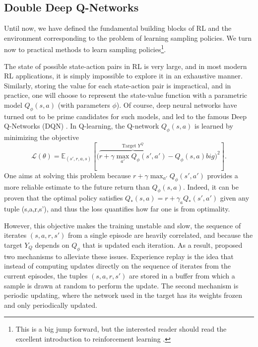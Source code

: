 \subsection{Double Deep Q-Networks}
Until now, we have defined the fundamental building blocks of RL and the environment corresponding to the problem of learning sampling policies. We turn now to practical methods to learn sampling policies\footnote{This is a big jump forward, but the interested reader should read the excellent introduction to reinforcement learning \citep{weng2018a}.}.

The state of possible state-action pairs in RL is very large, and in most modern RL applications, it is simply impossible to explore it in an exhaustive manner. Similarly, storing the value for each state-action pair is impractical, and in practice, one will choose to represent the state-value function with a parametric model $Q_\phi(s,a)$ (with parameters $\phi$). Of course, deep neural networks have turned out to be prime candidates for such models, and led to the famous Deep Q-Networks (DQN) \citep{mnih2015human}. In Q-learning, the Q-network $Q_\phi(s,a)$ is learned by minimizing the objective
$$\mathcal{L}(\theta) = \mathbb{E}_{(s',r,a,s)}\left[\big(\overbrace{r + \gamma \max_{a'} Q_\phi(s',a')}^{\text{Target } Y^Q} - Q_\phi(s,a)big)^2\right].$$
One aims at solving this problem because $r + \gamma \max_{a'} Q_\phi(s',a')$ provides a more reliable estimate to the future return than $Q_\phi(s,a)$. Indeed, it can be proven that the optimal policy satisfies $Q_*(s,a) = r + \gamma_a Q_*(s',a')$ given any tuple (s,a,r,s'), and thus the loss quantifies how far one is from optimality. 

However, this objective makes the training unstable and slow, the sequence of iterates $(s,a,r,s')$ from a single episode are heavily correlated, and because the target $Y_Q$ depends on $Q_\phi$ that is updated each iteration. As a result, \citet{mnih2015human} proposed two mechanisms to alleviate these issues. Experience replay is the idea that instead of computing updates directly on the sequence of iterates from the current episodes, the tuples $(s,a,r,s')$ are stored in a buffer from which a sample is drawn at random to perform the update. The second mechanism is periodic updating, where the network used in the target has its weights frozen and only periodically updated.

